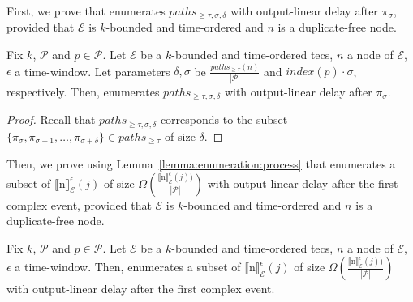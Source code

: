 First, we prove that  enumerates $paths_{\ge \tau, \sigma, \delta}$ with output-linear delay after $\pi_{\sigma}$, provided that $\mathcal{E}$ is $k$-bounded and time-ordered and $n$ is a duplicate-free node.

\begin{lemma}\label{lemma:enumeration:process}
Fix $k$, $\mathcal{P}$ and $p \in \mathcal{P}$. Let $\mathcal{E}$ be a $k$-bounded and time-ordered \acrshort{tecs}, $n$ a node of $\mathcal{E}$, $\epsilon$ a time-window. Let parameters $\delta, \sigma$ be $\frac{paths_{\ge \tau}(n)}{|\mathcal{P}|}$ and $index(p) \cdot \sigma$, respectively. Then,  enumerates $paths_{\ge \tau, \sigma, \delta}$ with output-linear delay after $\pi_{\sigma}$.
\end{lemma}

\begin{proof}
Recall that $paths_{\ge \tau, \sigma, \delta}$ corresponds to the subset $\{ \pi_{\sigma}, \pi_{\sigma+1}, \ldots, \pi_{\sigma+\delta}\} \in paths_{\ge \tau}$ of size $\delta$.

\end{proof}




















Then, we prove using Lemma~\ref{lemma:enumeration:process} that  enumerates a subset of ${\llbracket \text{n} \rrbracket}^{\epsilon}_{\mathcal{E}}(j)$ of size $\Omega(\frac{{\llbracket \text{n} \rrbracket}^{\epsilon}_{\mathcal{E}}(j))}{|\mathcal{P}|})$ with output-linear delay after the first complex event, provided that $\mathcal{E}$ is $k$-bounded and time-ordered and $n$ is a duplicate-free node.

\begin{theorem}\label{theorem:enumeration:process}
Fix $k$, $\mathcal{P}$ and $p \in \mathcal{P}$. Let $\mathcal{E}$ be a $k$-bounded and time-ordered \acrshort{tecs}, $n$ a node of $\mathcal{E}$, $\epsilon$ a time-window. Then,  enumerates a subset of ${\llbracket \text{n} \rrbracket}^{\epsilon}_{\mathcal{E}}(j)$ of size $\Omega(\frac{{\llbracket \text{n} \rrbracket}^{\epsilon}_{\mathcal{E}}(j))}{|\mathcal{P}|})$ with output-linear delay after the first complex event.
\end{theorem}


